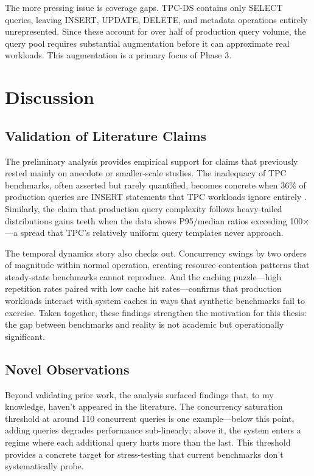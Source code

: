 \documentclass[12pt]{report}
\begin{document}
The more pressing issue is coverage gaps. TPC-DS contains only SELECT queries, leaving INSERT, UPDATE, DELETE, and metadata operations entirely unrepresented. Since these account for over half of production query volume, the query pool requires substantial augmentation before it can approximate real workloads. This augmentation is a primary focus of Phase 3.

\section{Discussion}
\label{sec:discussion}

\subsection{Validation of Literature Claims}
\label{subsec:validation}

The preliminary analysis provides empirical support for claims that previously rested mainly on anecdote or smaller-scale studies. The inadequacy of TPC benchmarks, often asserted but rarely quantified, becomes concrete when 36\% of production queries are INSERT statements that TPC workloads ignore entirely \cite{redset, snowset}. Similarly, the claim that production query complexity follows heavy-tailed distributions gains teeth when the data shows P95/median ratios exceeding 100$\times$---a spread that TPC's relatively uniform query templates never approach.

The temporal dynamics story also checks out. Concurrency swings by two orders of magnitude within normal operation, creating resource contention patterns that steady-state benchmarks cannot reproduce. And the caching puzzle---high repetition rates paired with low cache hit rates---confirms that production workloads interact with system caches in ways that synthetic benchmarks fail to exercise. Taken together, these findings strengthen the motivation for this thesis: the gap between benchmarks and reality is not academic but operationally significant.

\subsection{Novel Observations}
\label{subsec:novel}

Beyond validating prior work, the analysis surfaced findings that, to my knowledge, haven't appeared in the literature. The concurrency saturation threshold at around 110 concurrent queries is one example---below this point, adding queries degrades performance sub-linearly; above it, the system enters a regime where each additional query hurts more than the last. This threshold provides a concrete target for stress-testing that current benchmarks don't systematically probe.
\end{document}
